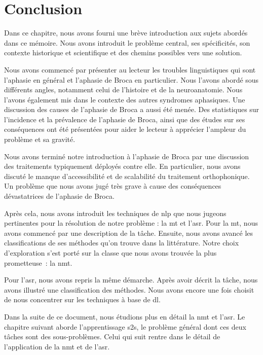 \section{Conclusion}%
\label{sec.general_notions.conclusion}

Dans ce chapitre, nous avons fourni une brève introduction aux sujets abordés dans ce mémoire.
Nous avons introduit le problème central, ses spécificités, son contexte historique et scientifique 
et des chemins possibles vers une solution.

Nous avons commencé par présenter au lecteur les troubles linguistiques qui sont 
l'aphasie en général et l'aphasie de Broca en particulier.
Nous l'avons abordé sous différents angles, notamment celui de l'histoire et de la neuroanatomie.
Nous l'avons également mis dans le contexte des autres syndromes aphasiques.
Une discussion des causes de l'aphasie de Broca a aussi été menée.
Des statistiques sur l'incidence et la prévalence de l'aphasie de Broca,
ainsi que des études sur ses conséquences ont été présentées
pour aider le lecteur à apprécier l'ampleur du problème et sa gravité.

Nous avons terminé notre introduction à l'aphasie de Broca 
par une discussion des traitements typiquement déployés contre elle.
En particulier, nous avons discuté le manque d'accessibilité et de scalabilité du traitement orthophonique.
Un problème que nous avons jugé très grave à cause des conséquences dévastatrices de l'aphasie de Broca.

Après cela, nous avons introduit les techniques de \gls{nlp} que nous jugeons pertinentes
pour la résolution de notre problème : la \gls{mt} et l'\gls{asr}.
Pour la \gls{mt}, nous avons commencé par une description de la tâche.
Ensuite, nous avons avancé les classifications de ses méthodes qu'on trouve dans la littérature.
Notre choix d'exploration s'est porté sur la classe que nous avons trouvée la plus prometteuse~:
la \gls{nmt}.

Pour l'\gls{asr}, nous avons repris la même démarche.
Après avoir décrit la tâche, nous avons illustré une classification des méthodes.
Nous avons encore une fois choisit de nous concentrer sur les techniques à base de \gls{dl}.

Dans la suite de ce document, nous étudions plus en détail la \gls{nmt} et l'\gls{asr}.
Le chapitre suivant aborde l'apprentissage \gls{s2s}, 
le problème général dont ces deux tâches sont des sous-problèmes.
Celui qui suit rentre dans le détail de l'application de la \gls{nmt} et de l'\gls{asr}.

